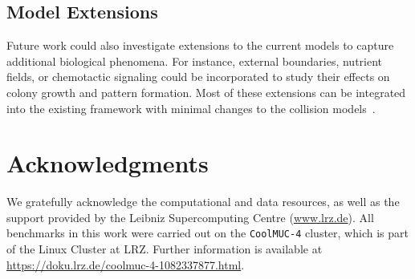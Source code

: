 \documentclass[conference]{IEEEtran}
\begin{document}
\subsection{Model Extensions}

Future work could also investigate extensions to the current models to capture additional biological phenomena. For instance, external boundaries, nutrient fields, or chemotactic signaling could be incorporated to study their effects on colony growth and pattern formation. Most of these extensions can be integrated into the existing framework with minimal changes to the collision models~\cite{Yan_2020}.

\section*{Acknowledgments}

We gratefully acknowledge the computational and data resources, as well as the support provided by the Leibniz Supercomputing Centre (\url{www.lrz.de}). All benchmarks in this work were carried out on the \texttt{CoolMUC-4} cluster, which is part of the Linux Cluster at LRZ. Further information is available at \url{https://doku.lrz.de/coolmuc-4-1082337877.html}.


\newpage

\balance


\newpage
\nobalance


\onecolumn

\appendix
\renewcommand{\thefigure}{A\arabic{figure}}
\renewcommand{\thetable}{A.\arabic{table}}
\setcounter{figure}{0}
\setcounter{table}{0}
\end{document}
